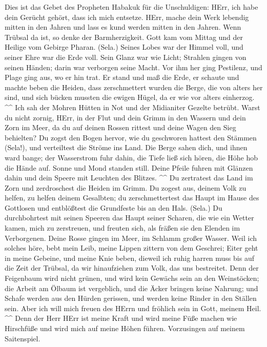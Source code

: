  Dies ist das Gebet des Propheten Habakuk für die
Unschuldigen:  HErr, ich habe dein Gerücht gehört, dass ich
mich entsetze. HErr, mache dein Werk lebendig mitten in den Jahren und
lass es kund werden mitten in den Jahren. Wenn Trübsal da ist, so denke
der Barmherzigkeit.  Gott kam vom Mittag und der Heilige vom
Gebirge Pharan. (Sela.) Seines Lobes war der Himmel voll, und seiner
Ehre war die Erde voll.  Sein Glanz war wie Licht; Strahlen
gingen von seinen Händen; darin war verborgen seine Macht. 
Vor ihm her ging Pestilenz, und Plage ging aus, wo er hin trat.
 Er stand und maß die Erde, er schaute und machte beben die
Heiden, dass zerschmettert wurden die Berge, die von alters her sind,
und sich bücken mussten die ewigen Hügel, da er wie vor alters
einherzog. \^{}\^{}  Ich sah der Mohren Hütten in Not und
der Midianiter Gezelte betrübt.  Warst du nicht zornig,
HErr, in der Flut und dein Grimm in den Wassern und dein Zorn im Meer,
da du auf deinen Rossen rittest und deine Wagen den Sieg behielten?
 Du zogst den Bogen hervor, wie du geschworen hattest den
Stämmen (Sela!), und verteiltest die Ströme ins Land.  Die
Berge sahen dich, und ihnen ward bange; der Wasserstrom fuhr dahin, die
Tiefe ließ sich hören, die Höhe hob die Hände auf.  Sonne
und Mond standen still. Deine Pfeile fuhren mit Glänzen dahin und dein
Speere mit Leuchten des Blitzes. \^{}\^{}  Du zertratest
das Land im Zorn und zerdroschest die Heiden im Grimm.  Du
zogest aus, deinem Volk zu helfen, zu helfen deinem Gesalbten; du
zerschmettertest das Haupt im Hause des Gottlosen und entblößtest die
Grundfeste bis an den Hals. (Sela.)  Du durchbohrtest mit
seinen Speeren das Haupt seiner Scharen, die wie ein Wetter kamen, mich
zu zerstreuen, und freuten sich, als fräßen sie den Elenden im
Verborgenen.  Deine Rosse gingen im Meer, im Schlamm großer
Wasser.  Weil ich solches höre, bebt mein Leib, meine
Lippen zittern von dem Geschrei; Eiter geht in meine Gebeine, und meine
Knie beben, dieweil ich ruhig harren muss bis auf die Zeit der Trübsal,
da wir hinaufziehen zum Volk, das uns bestreitet.  Denn der
Feigenbaum wird nicht grünen, und wird kein Gewächs sein an den
Weinstöcken; die Arbeit am Ölbaum ist vergeblich, und die Äcker bringen
keine Nahrung; und Schafe werden aus den Hürden gerissen, und werden
keine Rinder in den Ställen sein.  Aber ich will mich
freuen des HErrn und fröhlich sein in Gott, meinem Heil. \^{}\^{}
 Denn der Herr HErr ist meine Kraft und wird meine Füße
machen wie Hirschfüße und wird mich auf meine Höhen führen. Vorzusingen
auf meinem Saitenspiel.

